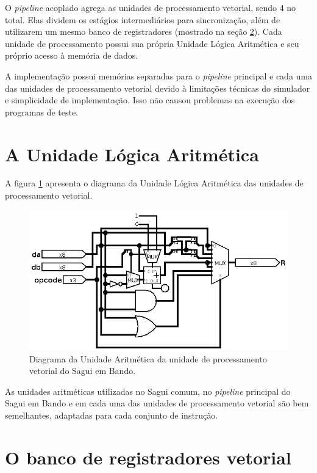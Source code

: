 \documentclass{article}
\begin{document}
O \textit{pipeline} acoplado agrega as unidades de processamento vetorial, sendo
4 no total. Elas dividem os estágios intermediários para sincronização, além de
utilizarem um mesmo banco de registradores (mostrado na seção \ref{banco}). Cada
unidade de processamento possui sua própria Unidade Lógica Aritmética e seu
próprio acesso à memória de dados.

A implementação possui memórias separadas para o \textit{pipeline} principal e
cada uma das unidades de processamento vetorial devido à limitações técnicas do
simulador e simplicidade de implementação. Isso não causou problemas na execução
dos programas de teste.

\section{A Unidade Lógica Aritmética}

A figura \ref{ula} apresenta o diagrama da Unidade Lógica Aritmética das
unidades de processamento vetorial.

\begin{figure}[h]
	\centering
	\includegraphics[width=\textwidth]{alu_simd.png}
	\caption{Diagrama da Unidade Aritmética da unidade de processamento vetorial
		do Sagui em Bando.}
	\label{ula}
\end{figure}

As unidades aritméticas utilizadas no Sagui comum, no \textit{pipeline}
principal do Sagui em Bando e em cada uma das unidades de processamento vetorial
são bem semelhantes, adaptadas para cada conjunto de instrução.

\section{O banco de registradores vetorial} \label{banco}
\end{document}
